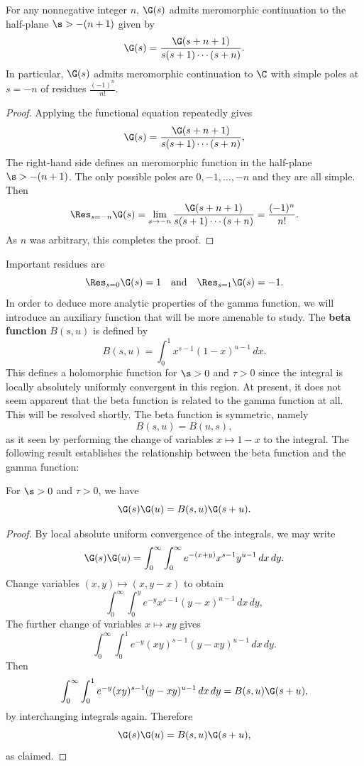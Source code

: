 \documentclass[12pt]{article}
\begin{document}
    \begin{theorem}\label{thm:continuation_of_gamma_function}
      For any nonnegative integer \(n\), \(\G(s)\) admits meromorphic continuation to the half-plane \(\s > -(n+1)\) given by
      \[
        \G(s) = \frac{\G(s+n+1)}{s(s+1) \cdots (s+n)}.
      \]
      In particular, \(\G(s)\) admits meromorphic continuation to \(\C\) with simple poles at \(s = -n\) of residues \(\frac{(-1)^{n}}{n!}\).
    \end{theorem}
    \begin{proof}
      Applying the functional equation repeatedly gives
      \[
        \G(s) = \frac{\G(s+n+1)}{s(s+1) \cdots (s+n)},
      \]
      The right-hand side defines an meromorphic function in the half-plane \(\s > -(n+1)\). The only possible poles are \(0,-1,\ldots,-n\) and they are all simple. Then
      \[
        \Res_{s = -n}\G(s) = \lim_{s \to -n}\frac{\G(s+n+1)}{s(s+1) \cdots (s+n)} = \frac{(-1)^{n}}{n!}. 
      \]
      As \(n\) was arbitrary, this completes the proof.
    \end{proof}

    Important residues are
    \[
      \Res_{s = 0}\G(s) = 1 \quad \text{and} \quad \Res_{s = 1}\G(s) = -1.
    \]
    In order to deduce more analytic properties of the gamma function, we will introduce an auxiliary function that will be more amenable to study. The \textbf{beta function} \(B(s,u)\) is defined by
    \[
      B(s,u) = \int_{0}^{1}x^{s-1}(1-x)^{u-1}\,dx.
    \]
    This defines a holomorphic function for \(\s > 0\) and \(\tau > 0\) since the integral is locally absolutely uniformly convergent in this region. At present, it does not seem apparent that the beta function is related to the gamma function at all. This will be resolved shortly. The beta function is symmetric, namely
    \[
      B(s,u) = B(u,s),
    \]
    as it seen by performing the change of variables \(x \mapsto 1-x\) to the integral. The following result establishes the relationship between the beta function and the gamma function:
    
    \begin{proposition}\label{prop:integral_reprepsentation_for_beta_function}
      For \(\s > 0\) and \(\tau > 0\), we have
      \[
        \G(s)\G(u) = B(s,u)\G(s+u).
      \]
    \end{proposition}
    \begin{proof}
      By local absolute uniform convergence of the integrals, we may write
      \[
        \G(s)\G(u) = \int_{0}^{\infty}\int_{0}^{\infty}e^{-(x+y)}x^{s-1}y^{u-1}\,dx\,dy.
      \]
      Change variables \((x,y) \mapsto (x,y-x)\) to obtain
      \[
        \int_{0}^{\infty}\int_{0}^{y}e^{-y}x^{s-1}(y-x)^{u-1}\,dx\,dy,
      \]
      The further change of variables \(x \mapsto xy\) gives
      \[
        \int_{0}^{\infty}\int_{0}^{1}e^{-y}(xy)^{s-1}(y-xy)^{u-1}\,dx\,dy.
      \]
      Then
      \[
        \int_{0}^{\infty}\int_{0}^{1}e^{-y}(xy)^{s-1}(y-xy)^{u-1}\,dx\,dy = B(s,u)\G(s+u),
      \]
      by interchanging integrals again. Therefore
      \[
        \G(s)\G(u) = B(s,u)\G(s+u),
      \]
      as claimed.
    \end{proof}
\end{document}

